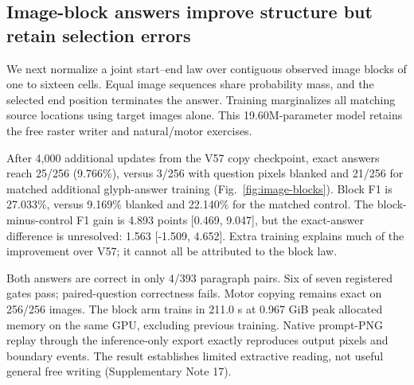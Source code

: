 \documentclass[12pt,a4paper]{article}
\begin{document}
\subsection*{Image-block answers improve structure but retain selection errors}
We next normalize a joint start--end law over contiguous observed image
blocks of one to sixteen cells. Equal image sequences share probability mass,
and the selected end position terminates the answer. Training marginalizes
all matching source locations using target images alone. This 19.60M-parameter
model retains the free raster writer and natural/motor exercises.

After 4,000 additional updates from the V57 copy checkpoint, exact answers
reach 25/256 (9.766\%), versus 3/256 with question pixels blanked and 21/256
for matched additional glyph-answer training (Fig.~\ref{fig:image-blocks}).
Block F1 is 27.033\%, versus 9.169\% blanked and 22.140\% for the matched
control. The block-minus-control F1 gain is 4.893 points [0.469, 9.047],
but the exact-answer difference is unresolved: 1.563 [-1.509, 4.652].
Extra training explains much of the improvement over V57; it cannot all be
attributed to the block law.

Both answers are correct in only 4/393 paragraph pairs. Six of seven
registered gates pass; paired-question correctness fails. Motor copying
remains exact on 256/256 images. The block arm trains in 211.0 s at
0.967 GiB peak allocated memory on the same GPU, excluding previous training.
Native prompt-PNG replay through the inference-only export exactly reproduces
output pixels and boundary events. The result establishes limited extractive
reading, not useful general free writing (Supplementary Note 17).

\end{document}

